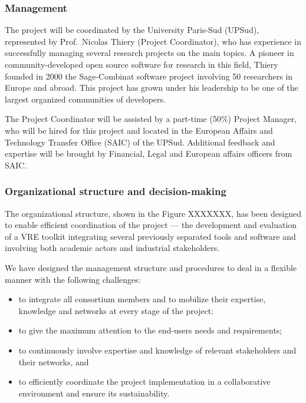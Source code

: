 \label{sect:mgt}

\subsubsection{Management}

The project will be coordinated by the University Paris-Sud (UPSud),
represented by Prof.~Nicolas Thiery (Project Coordinator), who has
experience in successfully managing several research projects on the
main \TheProject topics.  A pioneer in community-developed open source
software for research in this field, Thiery founded in 2000 the
Sage-Combinat software project involving 50 researchers in Europe and
abroad.  This project has grown under his leadership to be one of the
largest organized communities of \Sage developers.

The Project Coordinator will be assisted by a part-time (50\%) Project
Manager, who will be hired for this project and located in the
European Affairs and Technology Transfer Office (SAIC) of the UPSud.
Additional feedback and expertise will be brought by Financial, Legal
and European affairs officers from SAIC.

\subsubsection{Organizational structure and decision-making}


The organizational structure, shown in the Figure XXXXXXX, has been designed
to enable efficient coordination of the \TheProject project --- the
development and evaluation of a VRE toolkit
integrating several previously separated tools and software and
involving both academic actors and industrial stakeholders.

We have designed the management structure and procedures to deal in a
flexible manner with the following challenges:

\begin{itemize}
\item to integrate all consortium members and to mobilize their
  expertise, knowledge and networks at every stage of the project;
\item to give the maximum attention to the end-users needs and
  requirements;
\item to continuously involve expertise and knowledge of relevant
  stakeholders and their networks, and
\item to efficiently coordinate the project implementation in a
  collaborative environment and ensure its sustainability.
\end{itemize}

